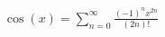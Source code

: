 \documentclass[preview]{standalone}
\begin{document}
\begin{align*}
\cos(x) = \sum_{n=0}^{\infty} \frac{(-1)^n x^{2n}}{(2n)!}
\end{align*}
\end{document}
